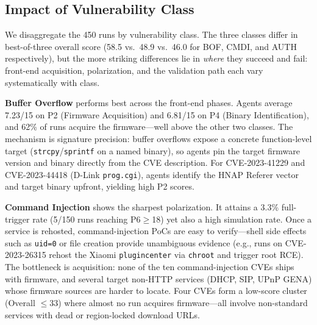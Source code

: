 \subsection{Impact of Vulnerability Class}



We disaggregate the 450 runs by vulnerability class. The three classes differ in best-of-three overall score (58.5 vs.\ 48.9 vs.\ 46.0 for BOF, CMDI, and AUTH respectively), but the more striking differences lie in \emph{where} they succeed and fail: front-end acquisition, polarization, and the validation path each vary systematically with class.




    






\noindent\textbf{Buffer Overflow} performs best across the front-end phases. Agents average 7.23/15 on P2 (Firmware Acquisition) and 6.81/15 on P4 (Binary Identification), and 62\% of runs acquire the firmware---well above the other two classes. The mechanism is signature precision: buffer overflows expose a concrete function-level target (\texttt{strcpy}/\texttt{sprintf} on a named binary), so agents pin the target firmware version and binary directly from the CVE description. For CVE-2023-41229 and CVE-2023-44418 (D-Link \texttt{prog.cgi}), agents identify the HNAP Referer vector and target binary upfront, yielding high P2 scores.



\noindent\textbf{Command Injection} shows the sharpest polarization. It attains a 3.3\% full-trigger rate (5/150 runs reaching P6$\geq$18) yet also a high simulation rate. Once a service is rehosted, command-injection PoCs are easy to verify---shell side effects such as \texttt{uid=0} or file creation provide unambiguous evidence (e.g., runs on CVE-2023-26315 rehost the Xiaomi \texttt{plugincenter} via \texttt{chroot} and trigger root RCE). The bottleneck is acquisition: none of the ten command-injection CVEs ships with firmware, and several target non-HTTP services (DHCP, SIP, UPnP GENA) whose firmware sources are harder to locate. Four CVEs form a low-score cluster (Overall $\leq$33) where almost no run acquires firmware---all involve non-standard services with dead or region-locked download URLs.




